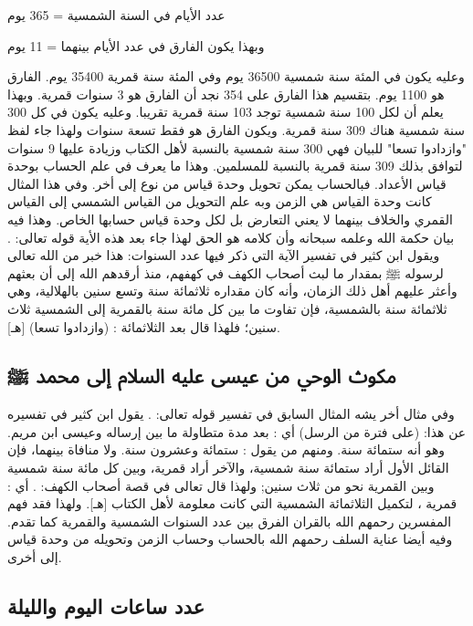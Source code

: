 عدد الأيام في السنة الشمسية = 365 يوم

وبهذا يكون الفارق في عدد الأيام بينهما = 11 يوم

وعليه يكون في المئة سنة شمسية 36500 يوم وفي المئة سنة قمرية 35400 يوم.
الفارق هو  1100 يوم. بتقسيم هذا الفارق على 354 نجد أن الفارق هو 3 سنوات قمرية. وبهذا يعلم أن لكل 100 سنة شمسية توجد 103 سنة قمرية تقريبا. وعليه يكون في كل 300 سنة شمسية هناك 309 سنة قمرية. ويكون الفارق هو فقط تسعة سنوات ولهذا جاء لفظ "وازدادوا تسعا" للبيان فهي 300 سنة شمسية بالنسبة لأهل الكتاب وزيادة عليها 9 سنوات لتوافق بذلك 309 سنة قمرية بالنسبة للمسلمين. وهذا ما يعرف في علم الحساب بوحدة قياس الأعداد. فبالحساب يمكن تحويل وحدة قياس من نوع إلى أخر. وفي هذا المثال كانت وحدة القياس هي الزمن وبه علم التحويل من القياس الشمسي إلى القياس القمري والخلاف بينهما لا يعني التعارض بل لكل وحدة قياس حسابها الخاص. وهذا فيه بيان حكمة الله وعلمه سبحانه وأن كلامه هو الحق لهذا جاء بعد هذه الأية قوله تعالى:
\quranayah*[18][26]{\footnotesize \surahname*[18]}.
ويقول ابن كثير في تفسير الآية التي ذكر فيها عدد السنوات:
هذا خبر من الله تعالى لرسوله ﷺ بمقدار ما لبث أصحاب الكهف في كهفهم، منذ أرقدهم الله إلى أن بعثهم وأعثر عليهم أهل ذلك الزمان، وأنه كان مقداره ثلاثمائة سنة وتسع سنين بالهلالية، وهي ثلاثمائة سنة بالشمسية، فإن تفاوت ما بين كل مائة سنة بالقمرية إلى الشمسية ثلاث سنين؛ فلهذا قال بعد الثلاثمائة : (وازدادوا تسعا) [هـ].

\subsection{مكوث الوحي من عيسى عليه السلام إلى محمد ﷺ}
وفي مثال أخر يشه المثال السابق في تفسير قوله تعالى:
\quranayah*[5][19]{\footnotesize \surahname*[5]}. يقول ابن كثير في تفسيره عن هذا: (على فترة من الرسل) أي : بعد مدة متطاولة ما بين إرساله وعيسى ابن مريم.
وهو أنه ستمائة سنة. ومنهم من يقول : ستمائة وعشرون سنة. ولا منافاة بينهما، فإن القائل الأول أراد ستمائة سنة شمسية، والآخر أراد قمرية، وبين كل مائة سنة شمسية وبين القمرية نحو من ثلاث سنين; ولهذا قال تعالى في قصة أصحاب الكهف:
\quranayah*[18][25]{\footnotesize \surahname*[18]}. أي : قمرية ، لتكميل الثلاثمائة الشمسية التي كانت معلومة لأهل الكتاب
[هـ]. ولهذا فقد فهم المفسرين رحمهم الله بالقران الفرق بين عدد السنوات الشمسية والقمرية كما تقدم. وفيه أيضا عناية السلف رحمهم الله بالحساب وحساب الزمن وتحويله من وحدة قياس إلى أخرى.

\subsection{عدد ساعات اليوم والليلة}

